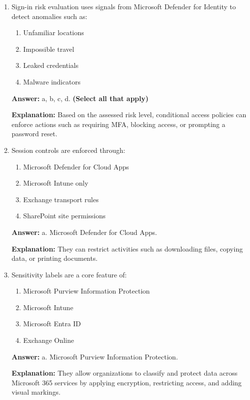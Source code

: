 \documentclass[10pt]{article}
\begin{document}
\begin{enumerate}[leftmargin=*]
\textbf{Answer:} True.

\textbf{Explanation:} This granularity is essential for tailoring security policies to the needs of different user groups.

\item Sign-in risk evaluation uses signals from Microsoft Defender for Identity to detect anomalies such as:
\begin{enumerate}[label=\alph*., leftmargin=1.5em]
\item Unfamiliar locations
\item Impossible travel
\item Leaked credentials
\item Malware indicators
\end{enumerate}
\textbf{Answer:} a, b, c, d. \textbf{(Select all that apply)}

\textbf{Explanation:} Based on the assessed risk level, conditional access policies can enforce actions such as requiring MFA, blocking access, or prompting a password reset.

\item Session controls are enforced through:
\begin{enumerate}[label=\alph*., leftmargin=1.5em]
\item Microsoft Defender for Cloud Apps
\item Microsoft Intune only
\item Exchange transport rules
\item SharePoint site permissions
\end{enumerate}
\textbf{Answer:} a. Microsoft Defender for Cloud Apps.

\textbf{Explanation:} They can restrict activities such as downloading files, copying data, or printing documents.

\item Sensitivity labels are a core feature of:
\begin{enumerate}[label=\alph*., leftmargin=1.5em]
\item Microsoft Purview Information Protection
\item Microsoft Intune
\item Microsoft Entra ID
\item Exchange Online
\end{enumerate}
\textbf{Answer:} a. Microsoft Purview Information Protection.

\textbf{Explanation:} They allow organizations to classify and protect data across Microsoft 365 services by applying encryption, restricting access, and adding visual markings.


\end{enumerate}
\end{document}
